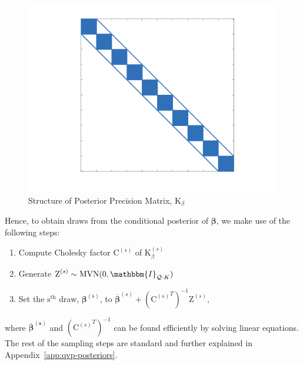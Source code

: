 %
\begin{figure}[h!]
    \centering
    \includegraphics[width=0.5\linewidth]{Figures/tridiag_covariance.png}
    \caption{Structure of Posterior Precision Matrix, $\text{K}_{\beta}$}
    \label{fig:precision_Kbeta}
\end{figure}
%
Hence, to obtain draws from the conditional posterior of $\boldsymbol{\beta}$, we make use of the following steps:
\begin{enumerate}
    \item Compute Cholesky factor $\text{C}^{(s)}$ of $\text{K}_{\beta}^{(s)}$
    \item Generate $\text{Z}^{(s)} \sim \mvn(0,\mathbbm{I}_{\mathcal{Q} \cdot K})$
    \item Set the $\text{s}^{\text{th}}$ draw, $\boldsymbol{\beta}^{(\text{s})}$, to $\overline{\boldsymbol{\beta}}^{(s)} + ({\text{C}^{(s)}}^T)^{-1}\text{Z}^{(s)}$,
\end{enumerate}
where $\boldsymbol{\overline{\beta}^{(s)}}$ and $({\text{C}^{(s)}}^T)^{-1}$ can be found efficiently by solving linear equations. The rest of the sampling steps are standard and further explained in Appendix~\ref{app:qvp-posteriors}.
%

%
